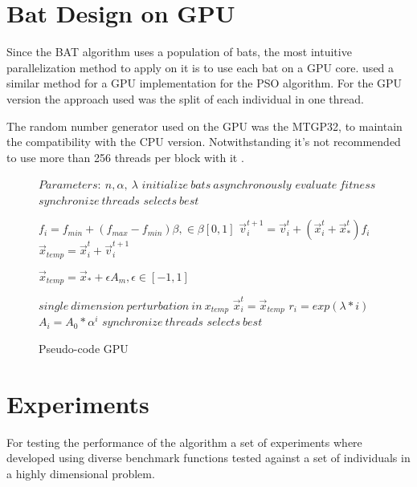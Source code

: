 \documentclass[conference]{IEEEtran}
\begin{document}
\section{Bat Design on GPU}

Since the BAT algorithm uses a population of bats, the most intuitive
parallelization method to apply on it is to use each bat on a GPU core.
\cite{pso-gpu} used a similar method for a GPU implementation for the PSO algorithm.
For the GPU version the approach used was the split of each individual in one thread.

The random number generator used on the GPU was the MTGP32, to
maintain the compatibility with the CPU version. Notwithstanding it's
not recommended to use more than 256 threads per block with it
\cite{curandIssue}.

\begin{figure}
\begin{algorithmic}[1]
\State $Parameters:\ n,\alpha,\ \lambda$
\State $initialize\ bats\ asynchronously$
\State $evaluate\ fitness$
\State $synchronize\ threads$
\State $selects\ best$

        \State $f_i=f_{min} + (f_{max} - f_{min})\beta, \in \beta [0,1]$
        \State $\vec{v}_i^{t+1} = \vec{v}_i^{t} + (\vec{x}_i^{t} + \vec{x}_*^{t})f_i$
        \State $\vec{x}_{temp} = \vec{x}_i^{t} + \vec{v}_i^{t+1}$


            \State $\vec{x}_{temp} = \vec{x}_* + \epsilon A_m, \epsilon \in [-1, 1]$
        \EndIf

        \State $single\ dimension\ perturbation\ in\ x_{temp}$
            \State $\vec{x}_i^t = \vec{x}_{temp}$
            \State $r_i = exp(\lambda * i)$
            \State $A_i =  A_{0} * \alpha^i$
        \EndIf
        \State $synchronize\ threads$
        \State $selects\ best$
    \EndFor
\EndWhile
\end{algorithmic}
\caption{Pseudo-code GPU}\label{GPU}
\end{figure}

\section{Experiments}

For testing the performance of the algorithm a set of experiments where
developed using diverse benchmark functions tested against a set of
individuals in a highly dimensional problem.
\end{document}
